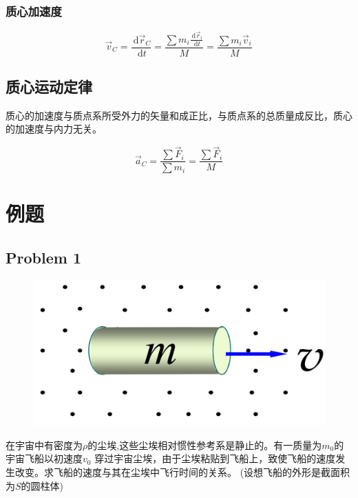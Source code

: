 \documentclass[12pt, a4paper]{article}
\numberwithin{equation}{section}
\newcommand{\rmd}{\mathrm{~d}}
\begin{document}
\subsubsection{质心加速度}

    \begin{equation}
        \overrightarrow{v}_C=\frac{\rmd \overrightarrow{r}_C}{\rmd t}=\frac{\sum m_i \frac{\rmd \overrightarrow{r}_i}{\rmd t}}{M}=\frac{\sum m_i \overrightarrow{v}_i}{M}
    \end{equation}

\subsection{质心运动定律}

    质心的加速度与质点系所受外力的矢量和成正比，与质点系的总质量成反比，质心的加速度与内力无关。

    \begin{equation}
        \overrightarrow{a}_C=\frac{\sum \overrightarrow{F}_i}{\sum m_i}=\frac{\sum \overrightarrow{F}_i}{M}
    \end{equation}


\section{例题}

\subsection{Problem 1}

    \begin{figure}
        \centering
        \includegraphics[scale=0.12]{"Chapter 03 images/pic7.png"}
        \label{pic7}
    \end{figure}

    在宇宙中有密度为\(\rho\)的尘埃,这些尘埃相对惯性参考系是静止的。有一质量为\(m_0\)的宇宙飞船以初速度\(v_0\)
    穿过宇宙尘埃，由于尘埃粘贴到飞船上，致使飞船的速度发生改变。求飞船的速度与其在尘埃中飞行时间的关系。
    (设想飞船的外形是截面积为\(S\)的圆柱体)
    \vspace{1em}
\end{document}
